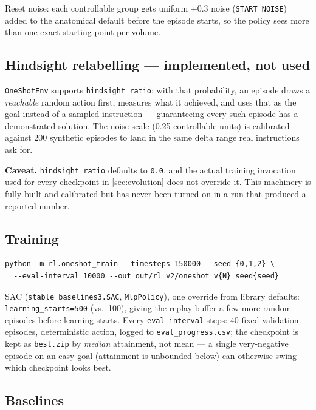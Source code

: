 \documentclass[10pt]{article}
\newcommand{\caveattext}[1]{\begin{findingbox}[colframe=black!30]\textbf{Caveat.} #1\end{findingbox}}
\newcommand{\code}[1]{\texttt{#1}}
\begin{document}
Reset noise: each controllable group gets uniform $\pm 0.3$ noise
(\code{START\_NOISE}) added to the anatomical default before the episode
starts, so the policy sees more than one exact starting point per volume.

\subsection{Hindsight relabelling --- implemented, not used}

\code{OneShotEnv} supports \code{hindsight\_ratio}: with that probability, an
episode draws a \emph{reachable} random action first, measures what it
achieved, and uses that as the goal instead of a sampled instruction ---
guaranteeing every such episode has a demonstrated solution. The noise scale
(0.25 controllable units) is calibrated against 200 synthetic episodes to
land in the same delta range real instructions ask for.

\caveattext{\code{hindsight\_ratio} defaults to \code{0.0}, and the actual
training invocation used for every checkpoint in \cref{sec:evolution} does
not override it. This machinery is fully built and calibrated but has never
been turned on in a run that produced a reported number.}

\subsection{Training}

\begin{lstlisting}
python -m rl.oneshot_train --timesteps 150000 --seed {0,1,2} \
  --eval-interval 10000 --out out/rl_v2/oneshot_v{N}_seed{seed}
\end{lstlisting}

SAC (\code{stable\_baselines3.SAC}, \code{MlpPolicy}), one override from
library defaults: \code{learning\_starts=500} (vs.\ 100), giving the replay
buffer a few more random episodes before learning starts. Every
\code{eval-interval} steps: 40 fixed validation episodes, deterministic
action, logged to \code{eval\_progress.csv}; the checkpoint is kept as
\code{best.zip} by \emph{median} attainment, not mean --- a single
very-negative episode on an easy goal (attainment is unbounded below) can
otherwise swing which checkpoint looks best.

\subsection{Baselines}
\end{document}
